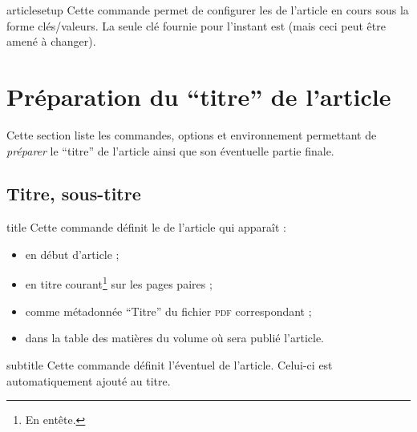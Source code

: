 \documentclass[french,nolocaltoc]{nwejmart}
\newtheorem[title=Fait,style=definition]{fact}
\begin{document}
\begin{docCommand}{articlesetup}{}
  Cette commande permet de configurer les  de l'article en cours
  sous la forme clés/valeurs. La seule clé fournie pour l'instant est
   (mais ceci peut être amené à changer).
\end{docCommand}


\section{Préparation du \enquote{titre} de l'article}
\label{sec-prep-de-lart}

Cette section liste les commandes, options et environnement permettant de
\emph{préparer} le \enquote{titre} de l'article ainsi que son éventuelle partie
finale.

\subsection{Titre, sous-titre}
\label{sec-titre}

\begin{docCommand}[doc description=\mandatory]{title}{}
  Cette commande définit le  de l'article qui apparaît :
  \begin{itemize}
  \item en début d'article ;
  \item en titre courant\footnote{En entête.} sur les pages paires ;
  \item comme métadonnée \enquote{Titre} du fichier \textsc{pdf} correspondant ;
  \item dans la table des matières du volume où sera publié l'article.
  \end{itemize}
\end{docCommand}

\begin{docCommand}{subtitle}{}
  Cette commande définit l'éventuel  de l'article. Celui-ci
  est automatiquement ajouté au titre.
\end{docCommand}
\end{document}
